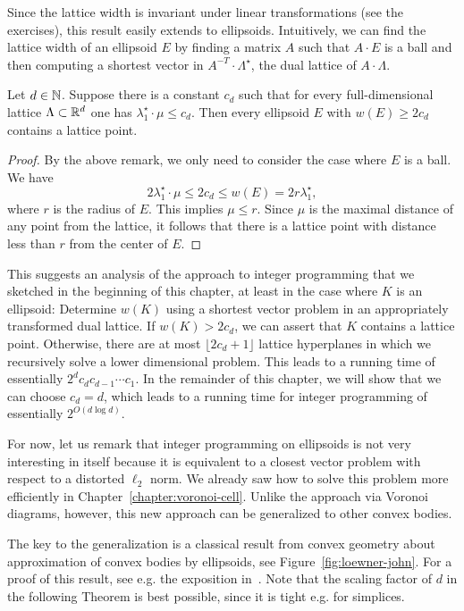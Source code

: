 Since the lattice width is invariant under linear transformations (see the exercises),
this result easily extends to ellipsoids.
Intuitively, we can find the lattice width of an ellipsoid $E$
by finding a matrix $A$ such that $A \cdot E$ is a ball
and then computing a shortest vector in $A^{-T} \cdot \Lambda^\star$,
the dual lattice of $A \cdot \Lambda$.

\begin{theorem}
  \label{thm:flatness-ellipsoids}
  Let $d \in \mathbb{N}$.
  Suppose there is a constant $c_d$ such that for every full-dimensional lattice $\Lambda \subset \mathbb{R}^d$
  one has $\lambda_1^\star \cdot \mu \leq c_d$.
  Then every ellipsoid $E$ with $w(E) \geq 2 c_d$ contains a lattice point.
\end{theorem}
\begin{proof}
  By the above remark, we only need to consider the case where $E$ is a ball.
  We have
  \[
    2 \lambda_1^\star \cdot \mu \leq 2 c_d \leq w(E) = 2r \lambda_1^\star,
  \]
  where $r$ is the radius of $E$.
  This implies $\mu \leq r$.
  Since $\mu$ is the maximal distance of any point from the lattice,
  it follows that there is a lattice point with distance less than $r$ from the center of $E$.
\end{proof}

This suggests an analysis of the approach to integer programming
that we sketched in the beginning of this chapter,
at least in the case where $K$ is an ellipsoid:
Determine $w(K)$ using a shortest vector problem in an appropriately transformed dual lattice.
If $w(K) > 2c_d$, we can assert that $K$ contains a lattice point.
Otherwise, there are at most $\lfloor 2c_d + 1 \rfloor$
lattice hyperplanes in which we recursively solve a lower dimensional problem.
This leads to a running time of essentially $2^d c_d c_{d-1} \cdots c_1$.
In the remainder of this chapter,
we will show that we can choose $c_d = d$,
which leads to a running time for integer programming of essentially $2^{O(d \log d)}$.

For now,
let us remark that integer programming on ellipsoids is not very interesting in itself
because it is equivalent to a closest vector problem
with respect to a distorted $\ell_2$ norm.
We already saw how to solve this problem more efficiently in Chapter~\ref{chapter:voronoi-cell}.
Unlike the approach via Voronoi diagrams, however,
this new approach can be generalized to other convex bodies.

The key to the generalization is a classical result from convex geometry
about approximation of convex bodies by ellipsoids, see Figure~\ref{fig:loewner-john}.
For a proof of this result, see e.g. the exposition in~\cite{MR1491097}.
Note that the scaling factor of $d$ in the following Theorem is best possible,
since it is tight e.g. for simplices.

